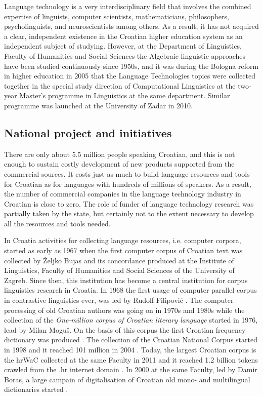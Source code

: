 \begin{multicols}{2}
Language technology is a very interdisciplinary field that involves the combined expertise of linguists, computer scientists, mathematicians, philosophers, psycholinguists, and neuroscientists among others. As a result, it has not acquired a clear, independent existence in the Croatian higher education system as an independent subject of studying. However, at the Department of Linguistics, Faculty of Humanities and Social Sciences the Algebraic linguistic approaches have been studied continuously since 1950s, and it was during the Bologna reform in higher education in 2005 that the Language Technologies topics were collected together in the special study direction of Computational Linguistics at the two-year Master’s programme in Linguistics at the same department. Similar programme was launched at the University of Zadar in 2010.

\subsection{National project and initiatives}

There are only about 5.5 million people speaking Croatian, and this is not enough to sustain costly development of new products supported from the commercial sources. It costs just as much to build language resources and tools for Croatian as for languages with hundreds of millions of speakers. As a result, the number of commercial companies in the language technology industry in Croatian is close to zero. The role of funder of language technology research was partially taken by the state, but certainly not to the extent necessary to develop all the resources and tools needed.


In Croatia activities for collecting language resources, i.e. computer corpora, started as early as 1967 when the first computer corpus of Croatian text was collected by Željko Bujas and its concordance produced \cite{boo3} at the Institute of Linguistics, Faculty of Humanities and Social Sciences of the University of Zagreb. Since then, this institution has become a central institution for corpus linguistics research in Croatia. In 1968 the first usage of computer parallel corpus in contrastive linguistics ever, was led by Rudolf Filipović \cite{art7}. The computer processing of old Croatian authors was going on in 1970s and 1980s while the collection of the \emph{One-million corpus of Croatian literary language} started in 1976, lead by Milan Moguš. On the basis of this corpus the first Croatian frequency dictionary was produced \cite{boo4}. The collection of the Croatian National Corpus \cite{str27} started in 1998 \cite{pro8, boo5} and it reached 101 million in 2004 \cite{pro9}. Today, the largest Croatian corpus is the hrWaC collected at the same Faculty in 2011 and it reached 1.2 billion tokens crawled from the .hr internet domain \cite{pro10}. In 2000 at the same Faculty, led by Damir Boras, a large campain of digitalisation of Croatian old mono- and multilingual dictionaries started \cite{str28}. 


\end{multicols}
